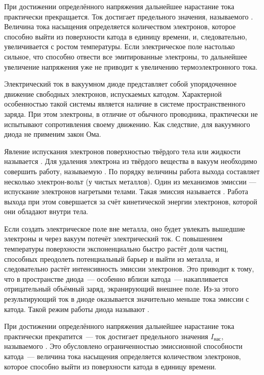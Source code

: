 При достижении определённого напряжения дальнейшее
нарастание тока практически прекращается. Ток достигает предельного значения,
называемого . Величина тока насыщения определяется количеством
электронов, которое способно выйти из поверхности катода в единицу времени, и,
следовательно, увеличивается с ростом температуры. Если электрическое поле настолько
сильное, что способно отвести все эмитированные электроны, то дальнейшее
увеличение напряжения уже не приводит к увеличению термоэлектронного тока.
\todo[inline]{<--}

Электрический ток в вакуумном диоде представляет собой упорядоченное движение
свободных электронов, испускаемых катодом. Характерной особенностью
такой системы является наличие в системе пространственного заряда. При этом
электроны, в отличие от обычного проводника, практически не испытывают
сопротивления своему движению. Как следствие, для вакуумного диода
не применим закон Ома.

Явление испускания электронов поверхностью твёрдого тела или жидкости называется
. Для удаления электрона из твёрдого вещества в
вакуум необходимо совершить работу, называемую . По порядку
величины работа выхода составляет несколько электрон-вольт (у чистых металлов).
Один из механизмов эмиссии --- испускание электронов нагретыми телами. Такая
эмиссия называется .
Работа выхода при этом совершается за счёт кинетической энергии электронов,
которой они обладают внутри тела.

Если создать электрическое поле вне металла, оно будет увлекать вышедшие
электроны и через вакуум потечёт электрический ток.
С повышением температуры поверхности экспоненциально быстро растёт доля частиц,
способных преодолеть потенциальный барьер и выйти из металла,
и следовательно растёт интенсивность эмиссии электронов. Это приводит к тому, что
в пространстве диода~--- особенно вблизи катода~--- накапливается отрицательный
объёмный заряд, экранирующий внешнее поле. Из-за этого результирующий ток в диоде
оказывается значительно меньше тока эмиссии с катода.
Такой режим работы диода называют .

При достижении определённого напряжения дальнейшее нарастание тока практически
прекратится~--- ток достигает предельного значения $I_{нас}$, называемого
. Это обусловлено ограниченностью эмиссионной способности
катода~--- величина тока насыщения определяется количеством электронов,
которое способно выйти из поверхности катода в единицу времени.
\todo[inline,color=green]{<---}


